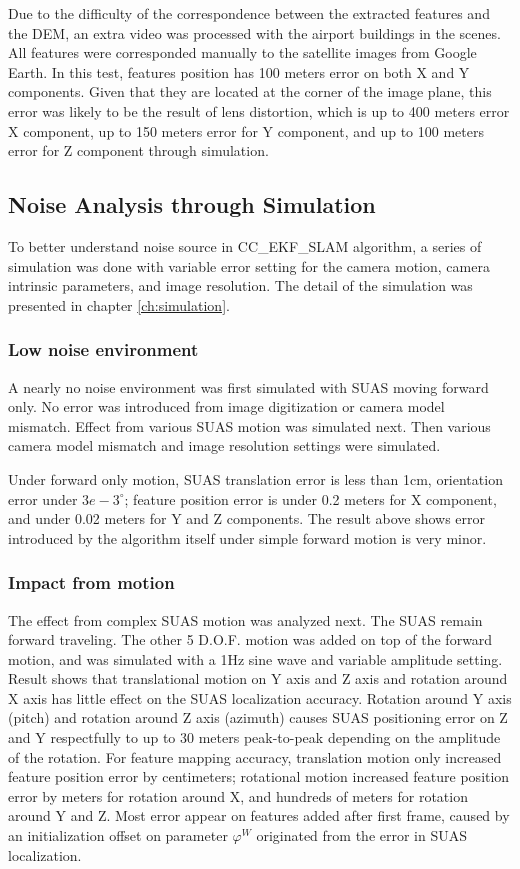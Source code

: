 Due to the difficulty of the correspondence between the extracted
features and the DEM, an extra video was processed with the airport
buildings in the scenes. All features were corresponded manually to
the satellite images from Google Earth. In this test, features
position has 100 meters error on both X and Y components. Given that
they are located at the corner of the image plane, this error was
likely to be the result of lens distortion, which is up to 400 meters
error X component, up to 150 meters error for Y component, and up to
100 meters error for Z component through simulation.

\subsection{Noise Analysis through Simulation}
To better understand noise source in CC\_EKF\_SLAM algorithm, a series of simulation was done with variable error setting for the camera motion, camera intrinsic parameters, and image resolution. The detail of the simulation was presented in chapter \ref{ch:simulation}.

\subsubsection{Low noise environment}
A nearly no noise environment was first simulated with SUAS moving forward only. No error was introduced from image digitization or camera model mismatch. Effect from various SUAS motion was simulated next. Then various camera model mismatch and image resolution settings were simulated. 

Under forward only motion, SUAS translation error is less than 1cm, orientation error under $3e-3^\circ$; feature position error is under 0.2 meters for X component, and under 0.02 meters for Y and Z components. The result above shows error introduced by the algorithm itself under simple forward motion is very minor.

\subsubsection{Impact from motion}
The effect from complex SUAS motion was analyzed next. The SUAS remain
forward traveling. The other 5 D.O.F. motion was added on top of the
forward motion, and was simulated with a 1Hz sine wave and variable
amplitude setting. Result shows that translational motion on Y axis
and Z axis and rotation around X axis has little effect on the SUAS
localization accuracy. Rotation around Y axis (pitch) and rotation
around Z axis (azimuth) causes SUAS positioning error on Z and Y
respectfully to up to 30 meters peak-to-peak depending on the
amplitude of the rotation. For feature mapping accuracy, translation
motion only increased feature position error by centimeters;
rotational motion increased feature position error by meters for
rotation around X, and hundreds of meters for rotation around Y and Z.
Most error appear on features added after first frame, caused by an
initialization offset on parameter $\varphi^W$ originated from the
error in SUAS localization.

